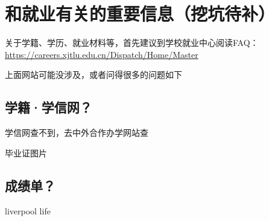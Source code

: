\section{和就业有关的重要信息（挖坑待补）}

关于学籍、学历、就业材料等，首先建议到学校就业中心阅读FAQ：\url{https://careers.xjtlu.edu.cn/Dispatch/Home/Master}

上面网站可能没涉及，或者问得很多的问题如下

\subsection{学籍·学信网？}

学信网查不到，去中外合作办学网站查

毕业证图片

\subsection{成绩单？}

liverpool life








% 

